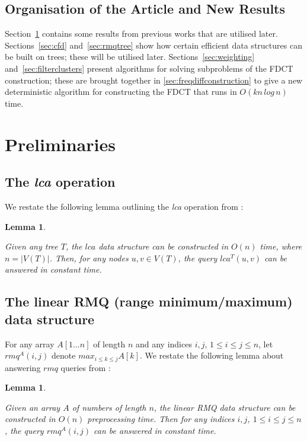 \documentclass{article}
\newtheorem{lca}[incompatibility]{Lemma}
\newtheorem{linearrmq}[incompatibility]{Lemma}
\begin{document}
    \subsection{Organisation of the Article and New Results}
    Section~\ref{sec:preliminaries} contains some results from previous works that are utilised later. Sections~\ref{sec:cfd} and~\ref{sec:rmqtree} show how certain efficient data structures can be built on trees; these will be utilised later. Sections~\ref{sec:weighting} and~\ref{sec:filterclusters} present algorithms for solving subproblems of the FDCT construction; these are brought together in \ref{sec:freqdiffconstruction} to give a new deterministic algorithm for constructing the FDCT that runs in $O(kn\,log\,n)$ time.

    \section{Preliminaries}
    \label{sec:preliminaries}

    \subsection{The \textit{lca} operation}

    We restate the following lemma outlining the \textit{lca} operation from \cite{bender2000lca}:
    \newline

    \begin{lca}
        \label{lem:lca}

        Given any tree $T$, the $lca$ data structure can be constructed in $O(n)$ time, where $n = |V(T)|$. Then, for any nodes $u, v \in V(T)$, the query $lca^{T}(u, v)$ can be answered in constant time.
    \end{lca}

    \subsection{The linear RMQ (range minimum/maximum) data structure}

    For any array $A[1 ... n]$ of length $n$ and any indices $i, j$, $1 \leq i \leq j \leq n$, let $rmq^A(i, j)$ denote $max_{i \leq k \leq j}A[k]$. We restate the following lemma about answering $rmq$ queries from \cite{bender2000lca}:
    \newline

    \begin{linearrmq}
        \label{lem:linearrmq}

        Given an array $A$ of numbers of length $n$, the \textit{linear RMQ data structure} can be constructed in $O(n)$ preprocessing time. Then for any indices $i, j$, $1 \leq i \leq j \leq n$, the query $rmq^A(i, j)$ can be answered in constant time.
    \end{linearrmq}
\end{document}
